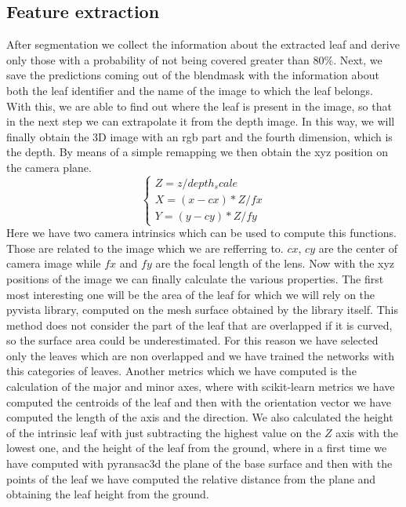\subsection{Feature extraction}
After segmentation we collect the information about the extracted leaf and derive only those with a probability of not being covered greater than 80\%.
Next, we save the predictions coming out of the blendmask with the information about both the leaf identifier and the name of the image to which the leaf belongs.
With this, we are able to find out where the leaf is present in the image, so that in the next step we can extrapolate it from the depth image. In this way, we will
finally obtain the 3D image with an rgb part and the fourth dimension, which is the depth. By means of a simple remapping we then obtain the xyz position on the camera plane.
$$
\begin{cases}
    Z = z / depth_scale \\
    X = (x - cx) * Z / fx \\
    Y = (y - cy) * Z / fy
\end{cases}
$$
Here we have two camera intrinsics which can be used to compute this functions. Those are related to the image which we are refferring to. $cx$, $cy$ are the 
center of camera image while $fx$ and $fy$ are the focal length of the lens. Now with the xyz positions of the image we can finally calculate the various properties. The first
most interesting one will be the area of the leaf for which we will rely on the pyvista \cite{sullivan2019pyvista} library, computed on the mesh surface obtained by the
library itself. This method does not consider the part of the leaf that are overlapped if it is curved, so the surface area could be underestimated. For this reason we
have selected only the leaves which are non overlapped and we have trained the networks with this categories of leaves. Another metrics which we have computed is
the calculation of the major and minor axes, where with scikit-learn \cite{scikit-learn} metrics we have computed the centroids of the leaf and then with the
orientation vector we have computed the length of the axis and the direction. We also calculated the height of the intrinsic leaf with just subtracting the highest
value on the $Z$ axis with the lowest one, and the height of the leaf from the ground, where in a first time we have computed with pyransac3d the plane of the base surface and
then with the points of the leaf we have computed the relative distance from the plane and obtaining the leaf height from the ground.


